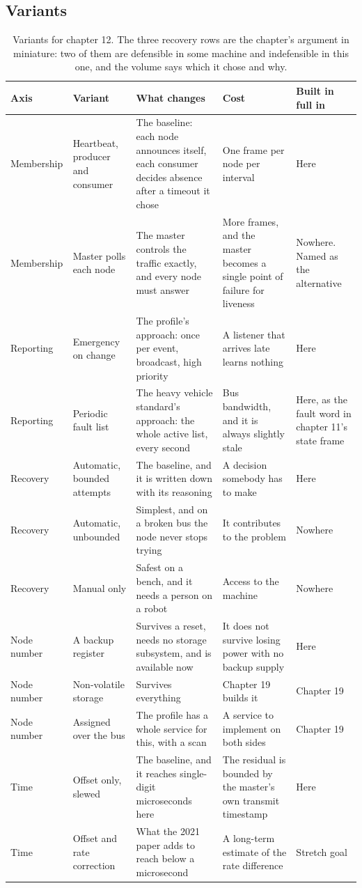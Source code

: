 \subsection*{Variants}

\begin{table}[H]\centering\small
\begin{tabular}{p{24mm}p{26mm}p{44mm}p{22mm}p{20mm}}
\toprule
Axis & Variant & What changes & Cost & Built in full in \\
\midrule
Membership & Heartbeat, producer and consumer & The baseline: each node announces itself, each consumer decides absence after a timeout it chose & One frame per node per interval & Here \\
Membership & Master polls each node & The master controls the traffic exactly, and every node must answer & More frames, and the master becomes a single point of failure for liveness & Nowhere. Named as the alternative \\
Reporting & Emergency on change & The profile's approach: once per event, broadcast, high priority & A listener that arrives late learns nothing & Here \\
Reporting & Periodic fault list & The heavy vehicle standard's approach: the whole active list, every second & Bus bandwidth, and it is always slightly stale & Here, as the fault word in chapter 11's state frame \\
Recovery & Automatic, bounded attempts & The baseline, and it is written down with its reasoning & A decision somebody has to make & Here \\
Recovery & Automatic, unbounded & Simplest, and on a broken bus the node never stops trying & It contributes to the problem & Nowhere \\
Recovery & Manual only & Safest on a bench, and it needs a person on a robot & Access to the machine & Nowhere \\
Node number & A backup register & Survives a reset, needs no storage subsystem, and is available now & It does not survive losing power with no backup supply & Here \\
Node number & Non-volatile storage & Survives everything & Chapter 19 builds it & Chapter 19 \\
Node number & Assigned over the bus & The profile has a whole service for this, with a scan & A service to implement on both sides & Chapter 19 \\
Time & Offset only, slewed & The baseline, and it reaches single-digit microseconds here & The residual is bounded by the master's own transmit timestamp & Here \\
Time & Offset and rate correction & What the 2021 paper adds to reach below a microsecond & A long-term estimate of the rate difference & Stretch goal \\
\bottomrule
\end{tabular}
\caption{Variants for chapter 12. The three recovery rows are the chapter's argument in miniature: two of them are defensible in some machine and indefensible in this one, and the volume says which it chose and why.}
\end{table}

